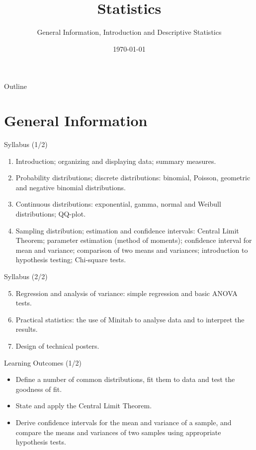 \documentclass[10pt,aspectratio=169]{beamer}
\title{Statistics}
\subtitle{General Information, Introduction and Descriptive Statistics}
\date{\today}
\begin{document}
\begin{frame}
  \titlepage
\end{frame}

\begin{frame}{Outline}
  \tableofcontents
\end{frame}

\section{General Information}

\begin{frame}{Syllabus (1/2)}
  \begin{enumerate}
    \item Introduction; organizing and displaying data; summary measures.
    \item Probability distributions; discrete distributions: binomial, Poisson,
          geometric and negative binomial distributions.
    \item Continuous distributions: exponential, gamma, normal and Weibull
          distributions; QQ-plot.
    \item Sampling distribution; estimation and confidence intervals:
          Central Limit Theorem; parameter estimation (method of moments);
          confidence interval for mean and variance; comparison of two means and
          variances; introduction to hypothesis testing; Chi-square tests.
  \end{enumerate}
\end{frame}

\begin{frame}{Syllabus (2/2)}
  \begin{enumerate}
    \setcounter{enumi}{4}
    \item Regression and analysis of variance: simple regression and basic
          ANOVA tests.
    \item Practical statistics: the use of Minitab to analyse data and to
          interpret the results.
    \item Design of technical posters.
  \end{enumerate}
\end{frame}

\begin{frame}{Learning Outcomes (1/2)}
  \begin{itemize}
    \item Define a number of common distributions, fit them to data and test
          the goodness of fit.
    \item State and apply the Central Limit Theorem.
    \item Derive confidence intervals for the mean and variance of a sample, and
          compare the means and variances of two samples using appropriate
          hypothesis tests.
  \end{itemize}
\end{frame}
\end{document}

